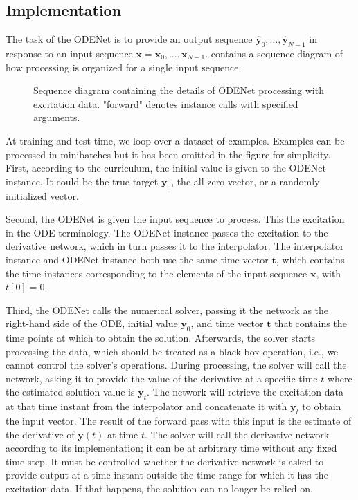 \subsection{Implementation}
\label{subsec:odenet_implementation}

The task of the ODENet is to provide an output sequence $\hat{\pmb{y}}_0, \dots, \hat{\pmb{y}}_{N-1}$ in response to an input sequence $\pmb{x} = \pmb{x}_0, \dots, \pmb{x}_{N-1}$.  contains a sequence diagram of how processing is organized for a single input sequence.

\begin{figure}
  \centering
  \scalebox{0.9}{}
  \caption{Sequence diagram containing the details of ODENet processing with excitation data. "forward" denotes instance calls with specified arguments.}
  \label{fig:odenet_sequence_diagram}
\end{figure}

At training and test time, we loop over a dataset of examples. Examples can be processed in minibatches but it has been omitted in the figure for simplicity. First, according to the curriculum, the initial value is given to the ODENet instance. It could be the true target $\pmb{y}_0$, the all-zero vector, or a randomly initialized vector. 

Second, the ODENet is given the input sequence to process. This the excitation in the \ac{ODE} terminology. The ODENet instance passes the excitation to the derivative network, which in turn passes it to the interpolator. The interpolator instance and ODENet instance both use the same time vector $\pmb{t}$, which contains the time instances corresponding to the elements of the input sequence $\pmb{x}$, with $t[0]=0$. 

Third, the ODENet calls the numerical solver, passing it the network as the right-hand side of the \ac{ODE}, initial value $\pmb{y}_0$, and time vector $\pmb{t}$ that contains the time points at which to obtain the solution. Afterwards, the solver starts processing the data, which should be treated as a black-box operation, i.e., we cannot control the solver's operations. During processing, the solver will call the network, asking it to provide the value of the derivative at a specific time $t$ where the estimated solution value is $\pmb{y}_t$. The network will retrieve the excitation data at that time instant from the interpolator and concatenate it with $\pmb{y}_t$ to obtain the input vector. The result of the forward pass with this input is the estimate of the derivative of $\pmb{y}(t)$ at time $t$. The solver will call the derivative network according to its implementation; it can be at arbitrary time without any fixed time step. It must be controlled whether the derivative network is asked to provide output at a time instant outside the time range for which it has the excitation data. If that happens, the solution can no longer be relied on. 

